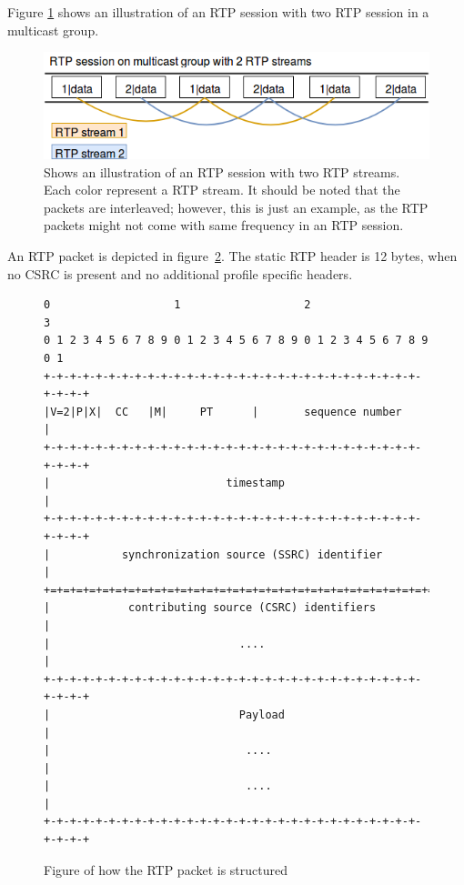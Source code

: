Figure \ref{fig:design:rtp:session} shows an illustration of an RTP session with two RTP session in a multicast group.
\begin{figure}[H]
	\centering
	\includegraphics[width=\textwidth]{figures/rtp-session}
	\caption{Shows an illustration of an RTP session with two RTP streams. Each color represent a RTP stream. It should be noted that the packets are interleaved; however, this is just an example, as the RTP packets might not come with same frequency in an RTP session.} \label{fig:design:rtp:session}
\end{figure}

An RTP packet is depicted in figure~\ref{fig:design:rtppacket}. The static RTP header is 12 bytes, when no CSRC is present and no additional profile specific headers.

\begin{figure}[H]
\centering
\begin{verbatim}
0                   1                   2                   3
0 1 2 3 4 5 6 7 8 9 0 1 2 3 4 5 6 7 8 9 0 1 2 3 4 5 6 7 8 9 0 1
+-+-+-+-+-+-+-+-+-+-+-+-+-+-+-+-+-+-+-+-+-+-+-+-+-+-+-+-+-+-+-+-+
|V=2|P|X|  CC   |M|     PT      |       sequence number         |
+-+-+-+-+-+-+-+-+-+-+-+-+-+-+-+-+-+-+-+-+-+-+-+-+-+-+-+-+-+-+-+-+
|                           timestamp                           |
+-+-+-+-+-+-+-+-+-+-+-+-+-+-+-+-+-+-+-+-+-+-+-+-+-+-+-+-+-+-+-+-+
|           synchronization source (SSRC) identifier            |
+=+=+=+=+=+=+=+=+=+=+=+=+=+=+=+=+=+=+=+=+=+=+=+=+=+=+=+=+=+=+=+=+
|            contributing source (CSRC) identifiers             |
|                             ....                              |
+-+-+-+-+-+-+-+-+-+-+-+-+-+-+-+-+-+-+-+-+-+-+-+-+-+-+-+-+-+-+-+-+
|                             Payload                           |
|                              ....                             |
|                              ....                             |
+-+-+-+-+-+-+-+-+-+-+-+-+-+-+-+-+-+-+-+-+-+-+-+-+-+-+-+-+-+-+-+-+
\end{verbatim}
\caption{Figure of how the RTP packet is structured\citep{RFC3550}}
\label{fig:design:rtppacket}
\end{figure}


